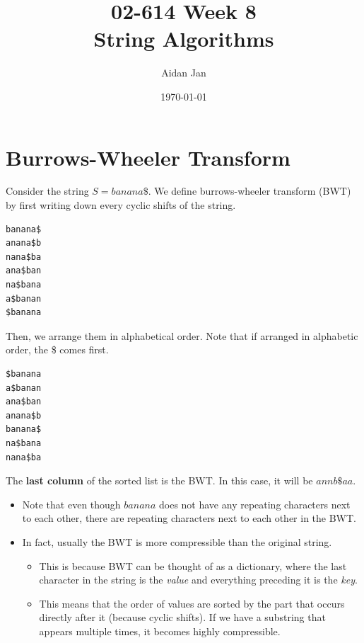 \documentclass[10pt]{article}
\title{02-614 Week 8 \\ \large{String Algorithms}}
\author{Aidan Jan}
\date{\today}
\begin{document}
\maketitle

\section*{Burrows-Wheeler Transform}
Consider the string $S = banana\$$.  We define burrows-wheeler transform (BWT) by first writing down every cyclic shifts of the string.
\begin{verbatim}
banana$
anana$b
nana$ba
ana$ban
na$bana
a$banan
$banana
\end{verbatim}
Then, we arrange them in alphabetical order.  Note that if arranged in alphabetic order, the \$ comes first.
\begin{verbatim}
$banana
a$banan
ana$ban
anana$b
banana$
na$bana
nana$ba
\end{verbatim}
The \textbf{last column} of the sorted list is the BWT.  In this case, it will be $annb\$aa$.
\begin{itemize}
    \item Note that even though $banana$ does not have any repeating characters next to each other, there are repeating characters next to each other in the BWT.
    \item In fact, usually the BWT is more compressible than the original string.
    \begin{itemize}
        \item This is because BWT can be thought of as a dictionary, where the last character in the string is the \textit{value} and everything preceding it is the \textit{key}.
        \item This means that the order of values are sorted by the part that occurs directly after it (because cyclic shifts).  If we have a substring that appears multiple times, it becomes highly compressible.
    \end{itemize}
\end{itemize}
\end{document}

